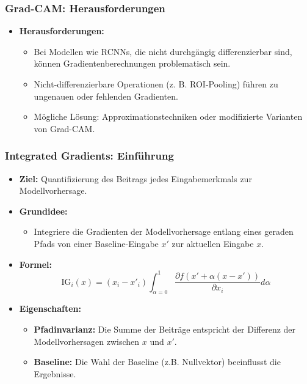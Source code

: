 \documentclass[aspectratio=1610, xcolor=dvipsnames, 9pt]{beamer}
\begin{document}
\begin{frame}
  \frametitle{Grad-CAM: Herausforderungen}
  \begin{itemize}
    \item \textbf{Herausforderungen:}
    \begin{itemize}
      \item Bei Modellen wie RCNNs, die nicht durchgängig differenzierbar sind, können Gradientenberechnungen problematisch sein.
      \item Nicht-differenzierbare Operationen (z. B. ROI-Pooling) führen zu ungenauen oder fehlenden Gradienten.
      \item Mögliche Lösung: Approximationstechniken oder modifizierte Varianten von Grad-CAM.
    \end{itemize}
  \end{itemize}
\end{frame}

\begin{frame}
  \frametitle{Integrated Gradients: Einführung}
  \begin{itemize}
    \item \textbf{Ziel:} Quantifizierung des Beitrags jedes Eingabemerkmals zur Modellvorhersage.
    \item \textbf{Grundidee:}
    \begin{itemize}
      \item Integriere die Gradienten der Modellvorhersage entlang eines geraden Pfads von einer Baseline-Eingabe $x'$ zur aktuellen Eingabe $x$.
    \end{itemize}
    \item \textbf{Formel:}
    \[
    \text{IG}_i(x) = (x_i - x'_i) \int_{\alpha=0}^1 \frac{\partial f(x' + \alpha (x - x'))}{\partial x_i} d\alpha
    \]
    \item \textbf{Eigenschaften:}
    \begin{itemize}
      \item \textbf{Pfadinvarianz:} Die Summe der Beiträge entspricht der Differenz der Modellvorhersagen zwischen $x$ und $x'$.
      \item \textbf{Baseline:} Die Wahl der Baseline (z.B. Nullvektor) beeinflusst die Ergebnisse.
    \end{itemize}
  \end{itemize}
\end{frame}
\end{document}
